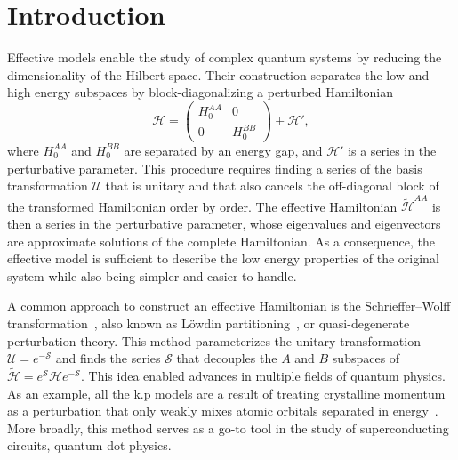 \section{Introduction}

Effective models enable the study of complex quantum systems by reducing the
dimensionality of the Hilbert space.
Their construction separates the low and high energy subspaces by
block-diagonalizing a perturbed Hamiltonian
%
\begin{equation}
    \mathcal{H} = \begin{pmatrix}H_0^{AA} & 0 \\ 0 & H_0^{BB}\end{pmatrix} + \mathcal{H}',
\end{equation}
%
where $H_0^{AA}$ and $H_0^{BB}$ are separated by an energy gap, and
$\mathcal{H}'$ is a series in the perturbative parameter.
This procedure requires finding a series of the basis transformation
$\mathcal{U}$ that is unitary and that also cancels the off-diagonal block of
the transformed Hamiltonian order by order.
The effective Hamiltonian $\tilde{\mathcal{H}}^{AA}$ is then a series in the
perturbative parameter, whose eigenvalues and eigenvectors are approximate
solutions of the complete Hamiltonian.
As a consequence, the effective model is sufficient to describe the low energy
properties of the original system while also being simpler and easier to
handle.

A common approach to construct an effective Hamiltonian is the
Schrieffer--Wolff transformation~\cite{Schrieffer_1966,Bravyi_2011}, also known
as Löwdin partitioning~\cite{White_1950}, or quasi-degenerate perturbation
theory.
This method parameterizes the unitary transformation $\mathcal{U} =
e^{-\mathcal{S}}$ and finds the series $\mathcal{S}$ that decouples the $A$ and
$B$ subspaces of $\tilde{\mathcal{H}} =
e^{\mathcal{S}}\mathcal{H}e^{-\mathcal{S}}$.
This idea enabled advances in multiple fields of quantum physics.
As an example, all the k.p models are a result of treating crystalline momentum
as a perturbation that only weakly mixes atomic orbitals separated in
energy~\cite{Luttinger_1955}.
More broadly, this method serves as a go-to tool in the study of
superconducting circuits, quantum dot physics. 

